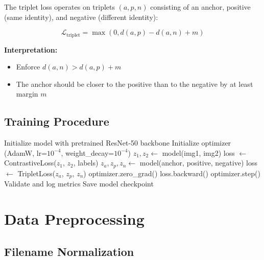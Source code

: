 \documentclass[12pt,a4paper]{article}
\begin{document}
The triplet loss operates on triplets $(a, p, n)$ consisting of an anchor, positive (same identity), and negative (different identity):

\begin{equation}
    \mathcal{L}_{\text{triplet}} = \max(0, d(a, p) - d(a, n) + m)
\end{equation}

\textbf{Interpretation:}
\begin{itemize}
    \item Enforce $d(a, n) > d(a, p) + m$
    \item The anchor should be closer to the positive than to the negative by at least margin $m$
\end{itemize}

\subsection{Training Procedure}

\begin{algorithm}[H]
\caption{Training Loop}
\begin{algorithmic}[1]
\State Initialize model with pretrained ResNet-50 backbone
\State Initialize optimizer (AdamW, lr=$10^{-4}$, weight\_decay=$10^{-4}$)
            \State $z_1, z_2 \gets$ model(img1, img2)
            \State loss $\gets$ ContrastiveLoss($z_1$, $z_2$, labels)
        \Else
            \State $z_a, z_p, z_n \gets$ model(anchor, positive, negative)
            \State loss $\gets$ TripletLoss($z_a$, $z_p$, $z_n$)
        \EndIf
        \State optimizer.zero\_grad()
        \State loss.backward()
        \State optimizer.step()
    \EndFor
    \State Validate and log metrics
\EndFor
\State Save model checkpoint
\end{algorithmic}
\end{algorithm}

\section{Data Preprocessing}
\label{sec:preprocessing}

\subsection{Filename Normalization}
\end{document}
